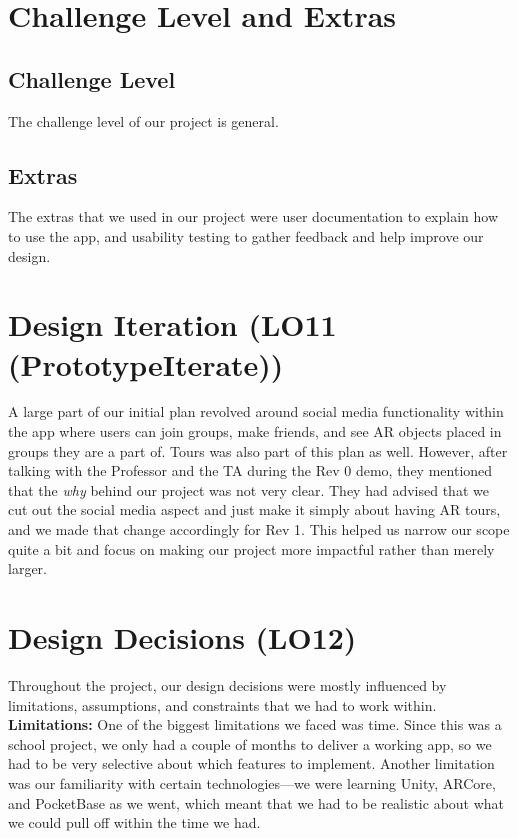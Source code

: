 \documentclass{article}
\begin{document}
\section{Challenge Level and Extras}

\subsection{Challenge Level}

The challenge level of our project is general.

\subsection{Extras}

The extras that we used in our project were user documentation to explain how to use the app, and usability testing to gather feedback and help improve our design.

\section{Design Iteration (LO11 (PrototypeIterate))}

A large part of our initial plan revolved around social media functionality within the app where users can join groups, make friends, and see AR objects placed in groups they are a part of. Tours was also part of this plan as well. However, after talking with the Professor and the TA during the Rev 0 demo,  they mentioned that the \textit{why} behind our project was not very clear. They had advised that we cut out the social media aspect and just make it simply about having AR tours, and we made that change accordingly for Rev 1. This helped us narrow our scope quite a bit and focus on making our project more impactful rather than merely larger.

\section{Design Decisions (LO12)}

Throughout the project, our design decisions were mostly influenced by limitations, assumptions, and constraints that we had to work within. \\

\textbf{Limitations:} One of the biggest limitations we faced was time. Since this was a school project, we only had a couple of months to deliver a working app, so we had to be very selective about which features to implement. Another limitation was our familiarity with certain technologies—we were learning Unity, ARCore, and PocketBase as we went, which meant that we had to be realistic about what we could pull off within the time we had. \\
\end{document}
